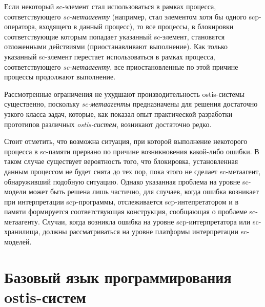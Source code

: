 Если некоторый sc-элемент стал использоваться в рамках процесса, соответствующего \textit{sc-метаагенту} (например, стал элементом хотя бы одного scp-оператора, входящего в данный процесс), то все процессы, в блокировки соответствующие которым попадает указанный sc-элемент, становятся отложенными действиями (приостанавливают выполнение). Как только указанный sc-элемент перестает использоваться в рамках процесса, соответствующего \textit{sc-метаагенту}, все приостановленные по этой причине процессы продолжают выполнение.

Рассмотренные ограничения не ухудшают производительность ostis-системы существенно, поскольку \textit{sc-метаагенты} предназначены для решения достаточно узкого класса задач, которые, как показал опыт практической разработки прототипов различных \textit{ostis-систем}, возникают достаточно редко.
	
Стоит отметить, что возможна ситуация, при которой выполнение некоторого процесса в sc-памяти прервано по причине возникновения какой-либо ошибки. В таком случае существует вероятность того, что блокировка, установленная данным процессом не будет снята до тех пор, пока этого не сделает sc-метаагент, обнаруживший подобную ситуацию. Однако указанная проблема на уровне sc-модели может быть решена лишь частично, для случаев, когда ошибка возникает при интерпретации scp-программы, отслеживается scp-интепретатором и в памяти формируется соответствующая конструкция, сообщающая о проблеме sc-метаагенту. Случаи, когда возникла ошибка на уровне scp-интерпретатора или sc-хранилища, должны рассматриваться на уровне платформы интерпретации sc-моделей.

\section{Базовый язык программирования ostis-систем}

